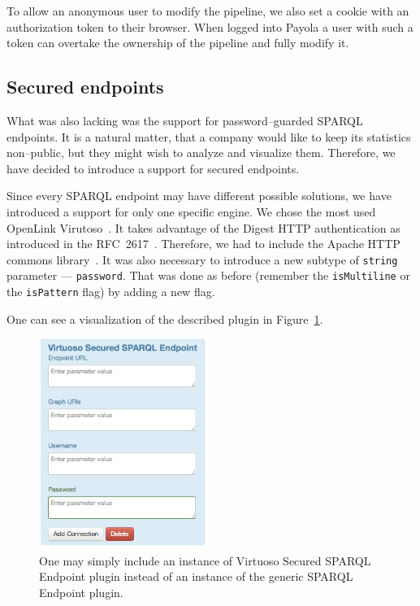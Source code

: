To allow an anonymous user to modify the pipeline, we also set a 
cookie with an authorization token to their browser. When logged into  
Payola a user with such a token can overtake the ownership of the pipeline and 
fully modify it.

\subsection{Secured endpoints}
What was also lacking was the support for password--guarded SPARQL endpoints. 
It is a natural matter, that a company would like to keep its statistics 
non--public, but they might wish to analyze and visualize them. Therefore, we 
have decided to introduce a support for secured endpoints.

Since every SPARQL endpoint may have different possible solutions, we have 
introduced a support for only one specific engine. We chose the most
used OpenLink Virutoso~\cite{virtuoso}.
It takes advantage of the Digest HTTP authentication as introduced in the 
RFC~2617~\cite{rfc-2617}. Therefore, we had to include the Apache HTTP commons 
library~\cite{apache-http-commons}. It was also necessary to introduce a new 
subtype of \texttt{string} parameter --- \texttt{password}. That was done as 
before (remember the \texttt{isMultiline} or the \texttt{isPattern} flag) by 
adding a new flag.

One can see a visualization of the described plugin in Figure~\ref{fig:secured-ds}. 

\begin{figure}
	\centering
	\includegraphics[width=55mm]{img/secured.png}
	\caption{One may simply include an instance of Virtuoso Secured SPARQL Endpoint plugin instead
	of an instance of the generic SPARQL Endpoint plugin.}
	\label{fig:secured-ds}
\end{figure}

